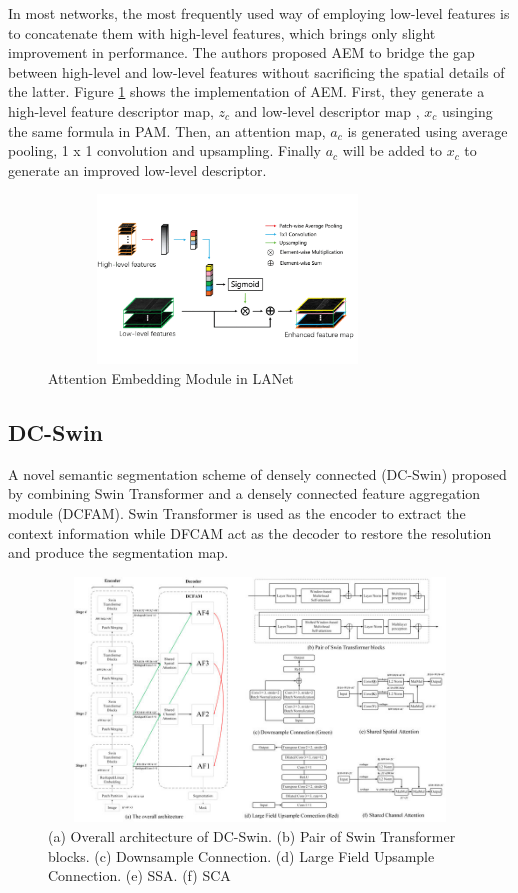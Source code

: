 In most networks, the most frequently used way of employing low-level features is to concatenate them with high-level features, which brings only slight improvement in performance. The authors proposed AEM to bridge the gap between high-level and low-level features without sacrificing the spatial details of the latter. Figure \ref{fig:aem} shows the implementation of AEM. First, they generate a high-level feature descriptor map, $z_c$ and low-level descriptor map , $x_c$ usinging the same formula in PAM. Then, an attention map, $a_c$ is generated using average pooling, 1 x 1 convolution and upsampling. Finally $a_c$ will be added to $x_c$ to generate an improved low-level descriptor.  
\begin{figure}[ht]
\includegraphics[width=9.5cm, height=4.5cm]{images/aem.png}
\centering
\caption{Attention Embedding Module in LANet \protect\cite{lanet}}
\label{fig:aem}
\end{figure}
\FloatBarrier


\subsection{DC-Swin}
A novel semantic segmentation scheme of densely connected (DC-Swin) \cite{a-novel-transformer} proposed by combining Swin Transformer and a densely connected feature aggregation module (DCFAM). Swin Transformer is used as the encoder to extract the context information while DFCAM act as the decoder to restore the resolution and produce the segmentation map.

\FloatBarrier
\begin{figure}[ht]
\includegraphics[width=12.5cm, height=6.5cm]{images/dc-swin.png}
\centering
\caption{(a) Overall architecture of DC-Swin. (b) Pair of Swin Transformer blocks. (c) Downsample Connection. (d) Large Field Upsample Connection. (e) SSA. (f) SCA \protect\cite{a-novel-transformer}}
\label{fig:dc}
\end{figure}


